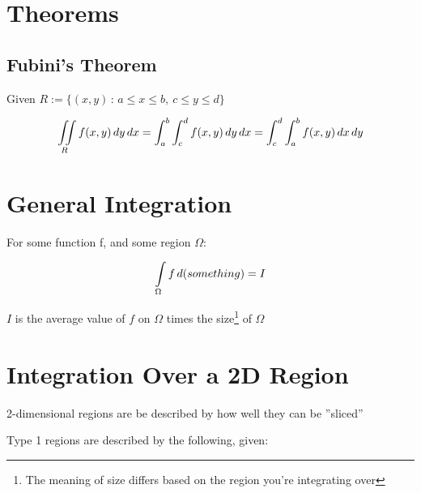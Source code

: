 \documentclass[12pt, letterpaper]{article}
\begin{document}
\maketitle

\section*{Theorems}

  \subsection*{Fubini's Theorem}

  Given  \( R := \{ (x, y)\,: \,a \leq x \leq b,\ c \leq y \leq d \}\)

  \begin{equation*}
    \iint\limits_R f(x,y)\, dy\,dx \\
    =
    \int_{a}^{b} \int_{c}^{d} f(x,y)\, dy\, dx \\
    = 
    \int_{c}^{d} \int_{a}^{b} f(x, y)\, dx\, dy \\
  \end{equation*}

\pagebreak

\section*{General Integration}

  {\Large
    For some function f, and some region \(\Omega\):
  }

  \begin{equation*}
    \int \limits_{\Omega} f\, d\\(something) = I
  \end{equation*}

  {\Large
    $I$ is the average value of $f$ on $\Omega$ times the size\footnote{The meaning of size differs based on the region you're integrating over} of $\Omega$
  }

\pagebreak

\section*{Integration Over a 2D Region}

  2-dimensional regions are be described by how well they can be ''sliced'' \newline
  
  Type 1 regions are described by the following, given:
\end{document}
